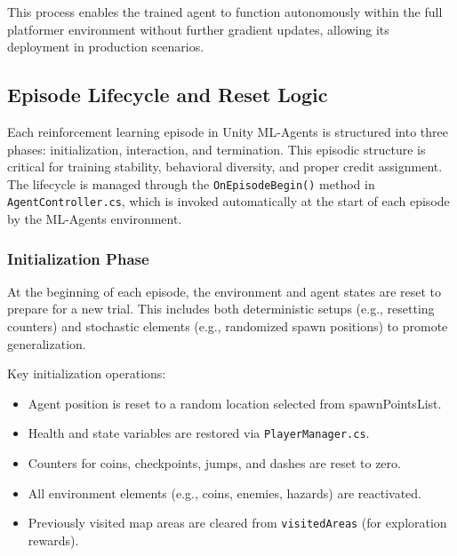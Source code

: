 \documentclass[12pt,oneside,openright,a4paper]{cpe-english-project}
\begin{document}
This process enables the trained agent to function autonomously within the full platformer environment without further gradient updates, allowing its deployment in production scenarios.

\subsection{Episode Lifecycle and Reset Logic}

Each reinforcement learning episode in Unity ML-Agents is structured into three phases: initialization, interaction, and termination. This episodic structure is critical for training stability, behavioral diversity, and proper credit assignment. The lifecycle is managed through the \texttt{OnEpisodeBegin()} method in \texttt{AgentController.cs}, which is invoked automatically at the start of each episode by the ML-Agents environment.

\subsubsection{Initialization Phase}

At the beginning of each episode, the environment and agent states are reset to prepare for a new trial. This includes both deterministic setups (e.g., resetting counters) and stochastic elements (e.g., randomized spawn positions) to promote generalization.

Key initialization operations:

\begin{itemize}
\item Agent position is reset to a random location selected from spawnPointsList.
\item Health and state variables are restored via \texttt{PlayerManager.cs}.
\item Counters for coins, checkpoints, jumps, and dashes are reset to zero.
\item All environment elements (e.g., coins, enemies, hazards) are reactivated.
\item Previously visited map areas are cleared from \texttt{visitedAreas} (for exploration rewards).
\end{itemize}
\end{document}

